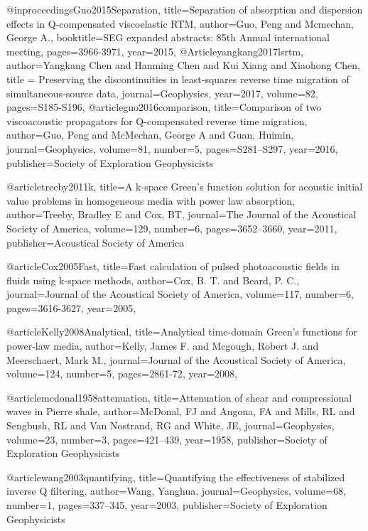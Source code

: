 {@inproceedings{Guo2015Separation,
  title={Separation of absorption and dispersion effects in {Q}-compensated viscoelastic {RTM}},
  author={Guo, Peng and Mcmechan, George A.},
  booktitle={SEG expanded abstracts: 85th Annual international meeting},
  pages={3966-3971},
  year={2015},
}
@Article{yangkang2017lsrtm,
  author={Yangkang Chen and Hanming Chen and Kui Xiang and Xiaohong Chen},
  title = {Preserving the discontinuities in least-squares reverse time migration of simultaneous-source data},
  journal={Geophysics},
  year=2017,
  volume=82,
  pages={S185-S196},
}
@article{guo2016comparison,
  title={Comparison of two viscoacoustic propagators for {Q}-compensated reverse time migration},
  author={Guo, Peng and McMechan, George A and Guan, Huimin},
  journal={Geophysics},
  volume={81},
  number={5},
  pages={S281--S297},
  year={2016},
  publisher={Society of Exploration Geophysicists}
}


@article{treeby2011k,
  title={A k-space Green's function solution for acoustic initial value problems in homogeneous media with power law absorption},
  author={Treeby, Bradley E and Cox, BT},
  journal={The Journal of the Acoustical Society of America},
  volume={129},
  number={6},
  pages={3652--3660},
  year={2011},
  publisher={Acoustical Society of America}
}

@article{Cox2005Fast,
  title={Fast calculation of pulsed photoacoustic fields in fluids using k-space methods},
  author={Cox, B. T. and Beard, P. C.},
  journal={Journal of the Acoustical Society of America},
  volume={117},
  number={6},
  pages={3616-3627},
  year={2005},
}

@article{Kelly2008Analytical,
  title={Analytical time-domain Green's functions for power-law media},
  author={Kelly, James F. and Mcgough, Robert J. and Meerschaert, Mark M.},
  journal={Journal of the Acoustical Society of America},
  volume={124},
  number={5},
  pages={2861-72},
  year={2008},
}

@article{mcdonal1958attenuation,
  title={Attenuation of shear and compressional waves in Pierre shale},
  author={McDonal, FJ and Angona, FA and Mills, RL and Sengbush, RL and Van Nostrand, RG and White, JE},
  journal={Geophysics},
  volume={23},
  number={3},
  pages={421--439},
  year={1958},
  publisher={Society of Exploration Geophysicists}
}

@article{wang2003quantifying,
  title={Quantifying the effectiveness of stabilized inverse {Q} filtering},
  author={Wang, Yanghua},
  journal={Geophysics},
  volume={68},
  number={1},
  pages={337--345},
  year={2003},
  publisher={Society of Exploration Geophysicists}
}

}
